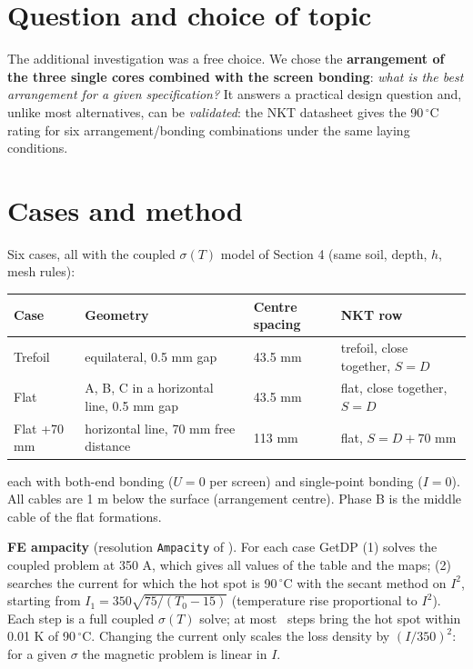 \def\ReportNumber{5}
\def\ReportName{Additional investigation: cable arrangement}

\usepackage{pgfplots}\pgfplotsset{compat=1.18}
\graphicspath{{../../Slides/figures/}}


\section*{Question and choice of topic}
\assignmentquestion{\QuestionFive}
\answer{\AnsFive}
The additional investigation was a free choice. We chose the
\textbf{arrangement of the three single cores combined with the screen bonding}: \emph{what is the
best arrangement for a given specification?} It answers a practical design question and, unlike
most alternatives, can be \emph{validated}: the NKT datasheet gives the 90\,\(^\circ\)C rating for
six arrangement/bonding combinations under the same laying conditions.

\section*{Cases and method}
Six cases, all with the coupled \(\sigma(T)\) model of Section 4 (same soil, depth, \(h\), mesh rules):
\begin{center}\small
\begin{tabular}{@{}llll@{}}\toprule
Case & Geometry & Centre spacing & NKT row\\\midrule
Trefoil & equilateral, 0.5 mm gap & 43.5 mm & trefoil, close together, \(S=D\)\\
Flat & A, B, C in a horizontal line, 0.5 mm gap & 43.5 mm & flat, close together, \(S=D\)\\
Flat +70 mm & horizontal line, 70 mm free distance & 113 mm & flat, \(S=D+70\) mm\\\bottomrule
\end{tabular}
\end{center}
\begin{center}
\end{center}
each with both-end bonding (\(U=0\) per screen) and single-point bonding (\(I=0\)). All cables are
1 m below the surface (arrangement centre). Phase B is the middle cable of the flat formations.

\textbf{FE ampacity} (resolution \texttt{Ampacity} of \afile). For each case GetDP (1) solves the
coupled problem at 350 A, which gives all values of the table and the maps; (2) searches the current
for which the hot spot is 90\,\(^\circ\)C with the secant method on \(I^2\), starting from
\(I_1=350\sqrt{75/(T_0-15)}\) (temperature rise proportional to \(I^2\)). Each step is a full
coupled \(\sigma(T)\) solve; at most \AmpStepsMax\ steps bring the hot spot within 0.01 K of 90\,\(^\circ\)C.
Changing the current only scales the loss density by \((I/350)^2\): for a given \(\sigma\) the magnetic
problem is linear in \(I\).

